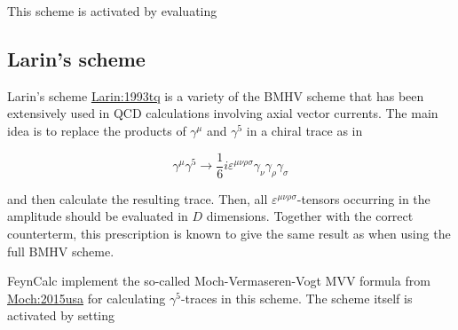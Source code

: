 \documentclass[../FeynCalcManual.tex]{subfiles}
\begin{document}
This scheme is activated by evaluating

\begin{Shaded}
\begin{Highlighting}[]
\OperatorTok{[}\OperatorTok{]}
\end{Highlighting}
\end{Shaded}

\hypertarget{larins-scheme}{%
\subsection{Larin's scheme}\label{larins-scheme}}

Larin's scheme
\href{https://arxiv.org/pdf/hep-ph/9302240.pdf}{Larin:1993tq} is a
variety of the BMHV scheme that has been extensively used in QCD
calculations involving axial vector currents. The main idea is to
replace the products of \(\gamma^\mu\) and \(\gamma^5\) in a chiral
trace as in

\begin{equation}
\gamma^\mu \gamma^5 \to \frac{1}{6} i \varepsilon^{\mu \nu \rho \sigma} \gamma_\nu \gamma_\rho \gamma_\sigma
\end{equation}

and then calculate the resulting trace. Then, all
\(\varepsilon^{\mu \nu \rho \sigma}\)-tensors occurring in the amplitude
should be evaluated in \(D\) dimensions. Together with the correct
counterterm, this prescription is known to give the same result as when
using the full BMHV scheme.

FeynCalc implement the so-called Moch-Vermaseren-Vogt MVV formula from
\href{https://arxiv.org/pdf/1506.04517.pdf}{Moch:2015usa} for
calculating \(\gamma^5\)-traces in this scheme. The scheme itself is
activated by setting

\begin{Shaded}
\begin{Highlighting}[]
\OperatorTok{[}\OperatorTok{]}
\end{Highlighting}
\end{Shaded}
\end{document}
